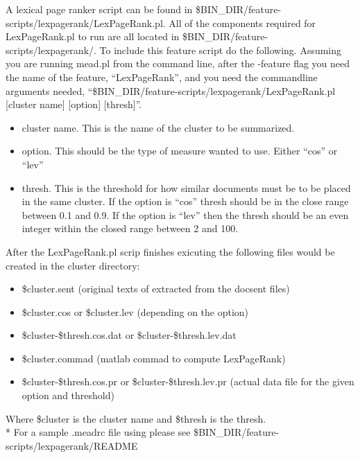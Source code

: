 \documentclass[10pt]{article}
\begin{document}
A lexical page ranker script can be found in \$BIN\_DIR/feature-scripts/lexpagerank/LexPageRank.pl.
All of the components required for LexPageRank.pl to run are all located in \$BIN\_DIR/feature-scripts/lexpagerank/.
To include this feature script do the following. 
Assuming you are running mead.pl from the command line, after the -feature flag you need the name of the feature, ``LexPageRank'', and you need the commandline arguments needed, ``\$BIN\_DIR/feature-scripts/lexpagerank/LexPageRank.pl [cluster name] [option] [thresh]''.
\begin{itemize} 
\item cluster name. This is the name of the cluster to be summarized.
\item option. This should be the type of measure wanted to use.  Either ``cos'' or ``lev''
\item thresh. This is the threshold for how similar documents must be to be placed in the same cluster.  If the option is ``cos'' thresh should be in the close range between 0.1 and 0.9.  If the option is ``lev'' then the thresh should be an even integer within the closed range between 2 and 100.
\end{itemize}
After the LexPageRank.pl scrip finishes exicuting the following files would be created in the cluster directory: 
\begin{itemize}
\item \$cluster.sent    (original texts of extracted from the docsent files)
\item \$cluster.cos or \$cluster.lev (depending on the option)
\item \$cluster-\$thresh.cos.dat or \$cluster-\$thresh.lev.dat
\item \$cluster.commad  (matlab commad to compute LexPageRank)
\item \$cluster-\$thresh.cos.pr  or \$cluster-\$thresh.lev.pr (actual data file for the given option and threshold)
\end{itemize}
Where \$cluster is the cluster name and \$thresh is the thresh.\\*
For a sample .meadrc file using please see \$BIN\_DIR/feature-scripts/lexpagerank/README
\end{document}
